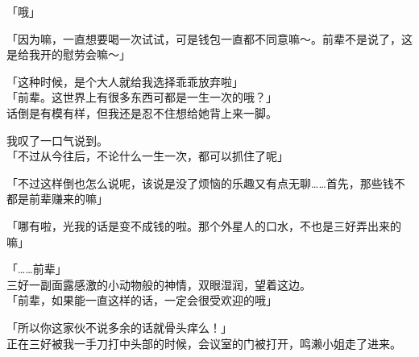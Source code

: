 「哦」

「因为嘛，一直想要喝一次试试，可是钱包一直都不同意嘛～。前辈不是说了，这是给我开的慰劳会嘛～」

「这种时候，是个大人就给我选择乖乖放弃啦」\\

「前辈。这世界上有很多东西可都是一生一次的哦？」\\

话倒是有模有样，但我还是忍不住想给她背上来一脚。

我叹了一口气说到。\\

「不过从今往后，不论什么一生一次，都可以抓住了呢」

「不过这样倒也怎么说呢，该说是没了烦恼的乐趣又有点无聊……首先，那些钱不都是前辈赚来的嘛」

「哪有啦，光我的话是变不成钱的啦。那个外星人的口水，不也是三好弄出来的嘛」

「……前辈」\\

三好一副面露感激的小动物般的神情，双眼湿润，望着这边。\\

「前辈，如果能一直这样的话，一定会很受欢迎的哦」

「所以你这家伙不说多余的话就骨头痒么！」\\

正在三好被我一手刀打中头部的时候，会议室的门被打开，鸣濑小姐走了进来。\\


